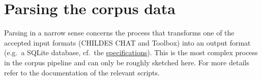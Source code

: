 \documentclass[a4paper, 11pt]{book}
\begin{document}
\section{Parsing the corpus data}
\label{sec:Parsing the corpus data}

Parsing in a narrow sense concerns the process that transforms one of the accepted input formats (CHILDES CHAT and Toolbox) into an output format (e.g.\ a SQLite database, cf.\ the \hyperref[sec:Structure of the corpus]{specifications}). This is the most complex process in the corpus pipeline and can only be roughly sketched here. For more details refer to the documentation of the relevant scripts. 

\end{document}
